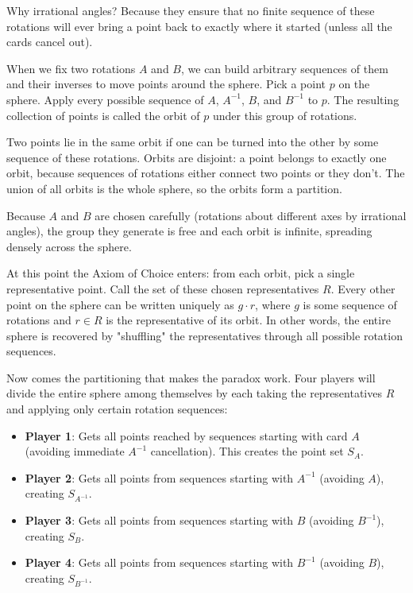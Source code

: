 Why irrational angles? Because they ensure that no finite sequence of these rotations will ever bring a point back to exactly where it started (unless all the cards cancel out).

When we fix two rotations $A$ and $B$, we can build arbitrary sequences of them and their inverses to move points around the sphere. Pick a point $p$ on the sphere. Apply every possible sequence of $A$, $A^{-1}$, $B$, and $B^{-1}$ to $p$. The resulting collection of points is called the orbit of $p$ under this group of rotations.

Two points lie in the same orbit if one can be turned into the other by some sequence of these rotations. Orbits are disjoint: a point belongs to exactly one orbit, because sequences of rotations either connect two points or they don't. The union of all orbits is the whole sphere, so the orbits form a partition.

Because $A$ and $B$ are chosen carefully (rotations about different axes by irrational angles), the group they generate is free and each orbit is infinite, spreading densely across the sphere.

At this point the Axiom of Choice enters: from each orbit, pick a single representative point. Call the set of these chosen representatives $R$. Every other point on the sphere can be written uniquely as $g \cdot r$, where $g$ is some sequence of rotations and $r \in R$ is the representative of its orbit. In other words, the entire sphere is recovered by "shuffling" the representatives through all possible rotation sequences. 

Now comes the partitioning that makes the paradox work. Four players will divide the entire sphere among themselves by each taking the representatives $R$ and applying only certain rotation sequences:

\begin{itemize}
\item \textbf{Player 1}: Gets all points reached by sequences starting with card $A$ (avoiding immediate $A^{-1}$ cancellation). This creates the point set $S_A$.
\item \textbf{Player 2}: Gets all points from sequences starting with $A^{-1}$ (avoiding $A$), creating $S_{A^{-1}}$.
\item \textbf{Player 3}: Gets all points from sequences starting with $B$ (avoiding $B^{-1}$), creating $S_B$.
\item \textbf{Player 4}: Gets all points from sequences starting with $B^{-1}$ (avoiding $B$), creating $S_{B^{-1}}$.
\end{itemize}

